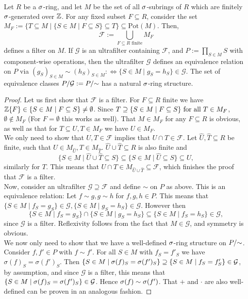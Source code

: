 \begin{lem}\label{lemmafilters}
Let $R$ be a $\sigma$-ring, and let $M$ be the set of all $\sigma$-subrings of $R$ which are finitely $\sigma$-generated over $\mathbb{Z}$. For any fixed subset $F \subseteq R$, consider the set $M_F:= \{ T \subseteq M \mid \{S \in M \mid F \subseteq S \} \subseteq T \} \subseteq \text{Pot}(M)$. 
Then, \[ \mathcal{F}:= \bigcup_{ F \subseteq R \text{ finite} } M_F \]
 defines a filter on $M$. If $\mathcal{G}$ is an ultrafilter containing $\mathcal{F}$, and $P:= \prod_{S \in M} S$ with component-wise operations,
 then the ultrafilter $\mathcal{G}$ defines an equivalence relation on $P$ via $(g_S)_{S \in M} \sim (h_S)_{S \in M} : \Leftrightarrow \{ S \in M \mid g_S = h_S \} \in \mathcal{G}$. 
The set of equivalence classes $P/\mathcal{G}:= P/\mathord{\sim}$ has a natural $\sigma$-ring structure. %
\begin{proof}
Let us first show that $\mathcal{F}$ is a filter. For $F \subseteq R$ finite we have $\mathbb{Z}\{F\} \in \{ S \in M \mid F \subseteq S \} \neq \emptyset$. Since $T \supseteq \{ S \in M \mid F \subseteq S \} \text{ for all } T \in M_F$, $\emptyset \notin M_F$ (For $F = \emptyset$ this works as well).
  That $M \in M_F$ for any $F \subseteq R$ is obvious, as well as that for $T \subseteq U, T \in M_F$ we have $U \in M_F$. \\ 
\indent We only need to show that $U,T \in \mathcal{F}$ implies that $U \cap T \in \mathcal{F}$.
  Let $\hat U, \hat T \subseteq R$ be finite, such that $U \in M_{\hat U}, T \in M_{\hat T}$. $\hat U \cup \hat T \subseteq R$ is also finite and $$\{ S \in M \mid \hat U \cup \hat T \subseteq S \} \subseteq \{ S \in M \mid \hat U \subseteq S \} \subseteq U,$$
 similarly for $T$. This means that $U \cap T \in M_{\hat U \cup \hat T} \subseteq \mathcal{F}$, which finishes the proof that $\mathcal{F}$ is a filter. \\

 Now, consider an ultrafilter $\mathcal{G} \supseteq \mathcal{F}$ and define $\sim$ on $P$ as above. This is an equivalence relation: Let $f \sim g, g \sim h$ for $f,g,h \in P$. 
 This means that $\{ S \in M \mid f_S = g_S \} \in \mathcal{G}, \{ S \in M \mid g_S = h_S \} \in \mathcal{G}$. However then $$\{ S \in M \mid f_S = g_S \} \cap \{ S \in M \mid g_S = h_S \} \subseteq \{ S \in M \mid f_S = h_S \} \in \mathcal{G},$$
 since $\mathcal{G}$ is a filter.
 Reflexivity follows from the fact that $M \in \mathcal{G}$, and symmetry is obvious. \\
\indent  We now only need to show that we have a well-defined $\sigma$-ring structure on $P/\mathord{\sim}$.
 Consider $f,f' \in P$ with $f \sim f'$. For all $S \in M$ with $f_S = f'_S$  we have $\sigma(f)_S = \sigma(f')_S$. 
 Then $\{ S \in M \mid \sigma(f)_S = \sigma(f')_S \} \supseteq \{ S \in M \mid f_S = f'_S \} \in \mathcal{G}$, by assumption, and since $\mathcal{G}$ is a filter, this means that $\{ S \in M \mid \sigma(f)_S = \sigma(f')_S \} \in \mathcal{G}$.
 Hence $\sigma(f) \sim \sigma(f')$. That $+$ and $\cdot$ are also well-defined can be proven in an analogous fashion.
\end{proof}
\end{lem}

